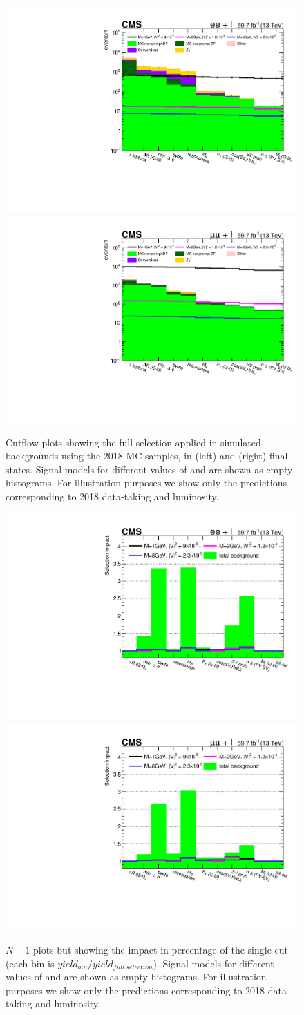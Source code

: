 \begin{figure}[h!]
\centering
  \includegraphics[clip,trim=0.9cm 0.7cm 0.7cm 0.7cm,width=.4\textwidth]{Figures/c6/selection/18/e_cutflow__0.pdf}
  \includegraphics[clip,trim=0.9cm 0.7cm 0.7cm 0.7cm,width=.4\textwidth]{Figures/c6/selection/18/mu_cutflow__0.pdf}\\
  \caption{Cutflow plots showing the full selection applied in simulated backgrounds using the 2018 MC samples,
    in \eex (left) and \mmx (right) final states.
    Signal models for different values of \mhnl and \mixpar
    are shown as empty histograms. For illustration purposes we show
    only the predictions corresponding to 2018 data-taking and luminosity.}
  \label{fig:cutflow1}
\end{figure}

\begin{figure}[h!]
\centering
   \includegraphics[clip,trim=0.9cm 0.7cm 0.7cm 0.7cm,width=.4\textwidth]{Figures/c6/selection/eff_e_cutflow_n_1__0.pdf}
  \includegraphics[clip,trim=0.9cm 0.7cm 0.7cm 0.7cm,width=.4\textwidth]{Figures/c6/selection/eff_mu_cutflow_n_1__0.pdf}
  \caption{
   $N-1$ plots but showing the impact in percentage of the single cut (each bin is $yield_{bin}/yield_{full\:selection}$).
    Signal models for different values of \mhnl and \mixpar
    are shown as empty histograms. For illustration purposes we show
    only the predictions corresponding to 2018 data-taking and luminosity.}
  \label{fig:cutflow2}
\end{figure}
\vspace{2mm}


